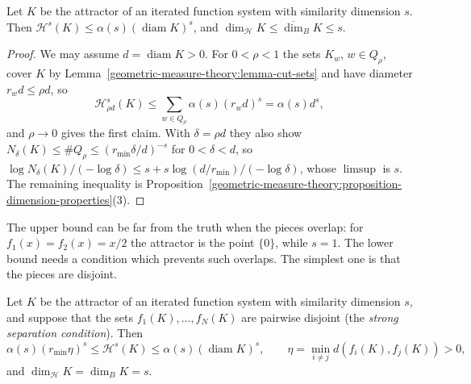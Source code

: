 \begin{proposition}\label{geometric-measure-theory:proposition-similarity-upper}
Let $K$ be the attractor of an iterated function system with similarity dimension $s$. Then $\mathcal{H}^s(K) \leq \alpha(s)(\operatorname{diam}K)^s$, and $\dim_{\mathcal{H}}K \leq \overline{\dim}_BK \leq s$.
\end{proposition}

\begin{proof}
We may assume $d = \operatorname{diam}K > 0$. For $0 < \rho < 1$ the sets $K_w$, $w \in Q_\rho$, cover $K$ by Lemma~\ref{geometric-measure-theory:lemma-cut-sets} and have diameter
$r_wd \leq \rho d$, so
\[
\mathcal{H}^s_{\rho d}(K) \leq \sum_{w \in Q_\rho}\alpha(s)(r_wd)^s = \alpha(s)d^s,
\]
and $\rho \to 0$ gives the first claim. With $\delta = \rho d$ they also show $N_\delta(K) \leq \#Q_\rho \leq (r_{\min}\delta/d)^{-s}$ for $0 < \delta < d$, so
$\log N_\delta(K)/(-\log\delta) \leq s + s\log(d/r_{\min})/(-\log\delta)$, whose $\limsup$ is $s$. The remaining inequality is
Proposition~\ref{geometric-measure-theory:proposition-dimension-properties}(3).
\end{proof}

The upper bound can be far from the truth when the pieces overlap: for $f_1(x) = f_2(x) = x/2$ the attractor is the point $\{0\}$, while $s = 1$. The lower bound needs a condition which prevents such
overlaps. The simplest one is that the pieces are disjoint.

\begin{theorem}\label{geometric-measure-theory:theorem-moran}
Let $K$ be the attractor of an iterated function system with similarity dimension $s$, and suppose that the sets $f_1(K), \ldots, f_N(K)$ are pairwise disjoint (the \emph{strong separation condition}).
Then
\[
\alpha(s)(r_{\min}\eta)^s \leq \mathcal{H}^s(K) \leq \alpha(s)(\operatorname{diam}K)^s, \qquad \eta = \min_{i \neq j}d(f_i(K), f_j(K)) > 0,
\]
and $\dim_{\mathcal{H}}K = \dim_BK = s$.
\end{theorem}

